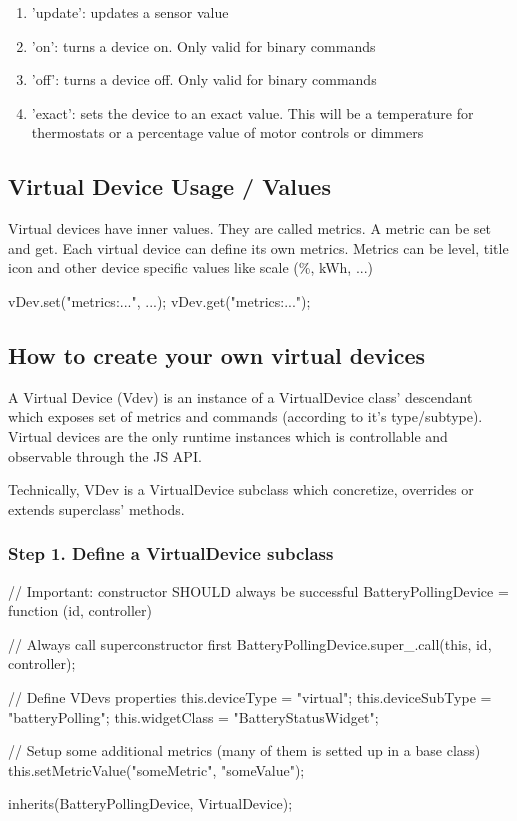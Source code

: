 \begin{enumerate}
\item 'update': updates a sensor value
\item 'on': turns a device on.  Only valid for binary commands
\item 'off': turns a device off. Only valid for binary commands
\item 'exact': sets the device to an exact value. This will be a temperature for 
thermostats or a percentage value of motor controls or dimmers
\end{enumerate}

\subsection{Virtual Device Usage / Values}

Virtual devices have inner values. They are called metrics. A metric can be set and get. 
Each virtual device can define its own metrics. Metrics can be level, title icon and 
other device specific values like scale (\%, kWh, ...)

\begin{listingverbatim}
vDev.set("metrics:...", ...);  
vDev.get("metrics:...");
\end{listingverbatim}

\subsection{How to create your own virtual devices}

A Virtual Device (Vdev) is an instance of a VirtualDevice class' descendant which exposes 
set of metrics and commands (according to it's type/subtype). Virtual devices are the only 
runtime instances which is controllable and observable through the JS API.

Technically, VDev is a VirtualDevice subclass which concretize, overrides or extends 
superclass' methods.

\subsubsection{Step 1. Define a VirtualDevice subclass}

\begin{listingverbatim}
// Important: constructor SHOULD always be successful
BatteryPollingDevice = function (id, controller) {
    // Always call superconstructor first
    BatteryPollingDevice.super_.call(this, id, controller);

    // Define VDevs properties
    this.deviceType = "virtual";
    this.deviceSubType = "batteryPolling";
    this.widgetClass = "BatteryStatusWidget";

    // Setup some additional metrics (many of them is setted up in a base class)
    this.setMetricValue("someMetric", "someValue");
}
inherits(BatteryPollingDevice, VirtualDevice);
\end{listingverbatim}

